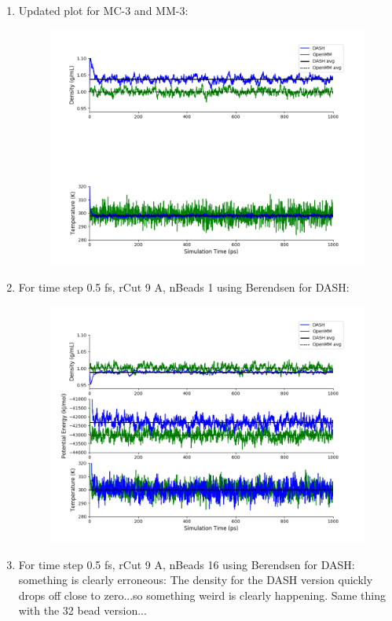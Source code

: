 \documentclass[12pt,reqno]{amsart}
\numberwithin{equation}{section}
\begin{document}
\begin{enumerate}
\begin{figure}[H]
\end{figure}
\item Updated plot for MC-3 and MM-3: 
\begin{figure}[H]
\centering
\includegraphics[scale=0.7]{MC-MM-nBead32-rCut9-ts05-update}
\end{figure}
\item For time step 0.5 fs, rCut 9 A, nBeads 1 using Berendsen for DASH:
\begin{figure}[H]
\centering
\includegraphics[scale=0.7]{B-MM-nBead1-rCut9-ts05-update}
\end{figure}

\item For time step 0.5 fs, rCut 9 A, nBeads 16 using Berendsen for DASH: something is clearly erroneous:
The density for the DASH version quickly drops off close to zero...so something weird is clearly happening.  Same thing with the 32 bead version...


\end{enumerate}
\end{document}
